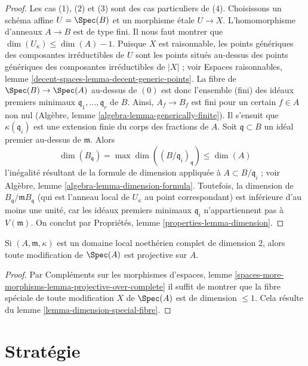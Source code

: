 \begin{proof}
Les cas (1), (2) et (3) sont des cas particuliers de (4). Choisissons un
schéma affine $U = \Spec(B)$ et un morphisme étale $U \to X$.
L'homomorphisme d'anneaux $A \to B$ est de type fini. Il nous faut montrer que
$\dim(U_\kappa) \leq \dim(A) - 1$. Puisque $X$ est raisonnable, les points
génériques des composantes irréductibles de $U$ sont les points situés
au-dessus des points génériques des composantes irréductibles de $|X|$ ; voir
Espaces raisonnables, lemme
\ref{decent-spaces-lemma-decent-generic-points}.
La fibre de $\Spec(B) \to \Spec(A)$ au-dessus de $(0)$ est donc l'ensemble
(fini) des idéaux premiers minimaux $\mathfrak q_1, \ldots, \mathfrak q_r$
de $B$. Ainsi, $A_f \to B_f$ est fini pour un certain $f \in A$ non nul
(Algèbre, lemme \ref{algebra-lemma-generically-finite}).
Il s'ensuit que $\kappa(\mathfrak q_i)$ est une extension finie du
corps des fractions de $A$.
Soit $\mathfrak q \subset B$ un idéal premier au-dessus de $\mathfrak m$. Alors
$$
\dim(B_\mathfrak q) = \max \dim((B/\mathfrak q_i)_{\mathfrak q})
\leq \dim(A)
$$
l'inégalité résultant de la formule de dimension appliquée à
$A \subset B/\mathfrak q_i$ ; voir Algèbre, lemme
\ref{algebra-lemma-dimension-formula}.
Toutefois, la dimension de $B_\mathfrak q/\mathfrak m B_\mathfrak q$
(qui est l'anneau local de $U_\kappa$ au point correspondant)
est inférieure d'au moins une unité, car les idéaux premiers minimaux
$\mathfrak q_i$ n'appartiennent pas à $V(\mathfrak m)$. On conclut par
Propriétés, lemme \ref{properties-lemma-dimension}.
\end{proof}

\begin{lemma}
\label{lemma-modification-of-dim-2-is-projective-over-complete}
Si $(A, \mathfrak m, \kappa)$ est un domaine local noethérien complet
de dimension $2$, alors toute modification de $\Spec(A)$ est projective sur $A$.
\end{lemma}

\begin{proof}
Par Compléments sur les morphismes d'espaces, lemme
\ref{spaces-more-morphisms-lemma-projective-over-complete}
il suffit de montrer que la fibre spéciale de toute modification
$X$ de $\Spec(A)$ est de dimension $\leq 1$.
Cela résulte du lemme \ref{lemma-dimension-special-fibre}.
\end{proof}






\section{Stratégie}
\label{section-strategy}

